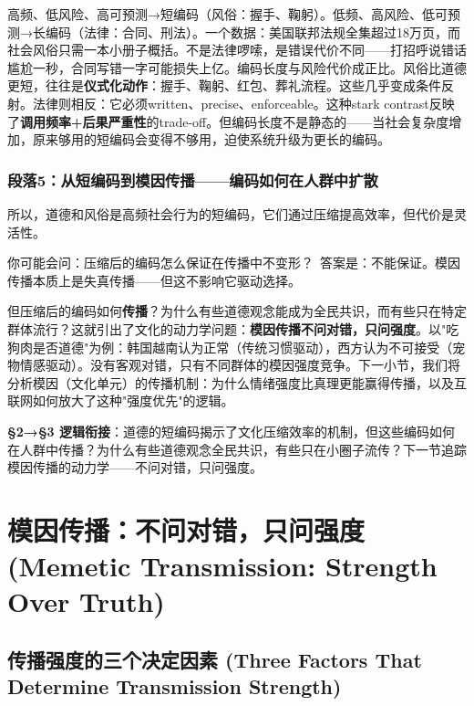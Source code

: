 \documentclass[../main.tex]{subfiles}
\begin{document}
高频、低风险、高可预测→短编码（风俗：握手、鞠躬）。低频、高风险、低可预测→长编码（法律：合同、刑法）。一个数据：美国联邦法规全集超过18万页，而社会风俗只需一本小册子概括。不是法律啰嗦，是错误代价不同——打招呼说错话尴尬一秒，合同写错一字可能损失上亿。编码长度与风险代价成正比。风俗比道德更短，往往是\textbf{仪式化动作}：握手、鞠躬、红包、葬礼流程。这些几乎变成条件反射。法律则相反：它必须written、precise、enforceable。这种stark contrast反映了\textbf{调用频率+后果严重性}的trade-off。但编码长度不是静态的——当社会复杂度增加，原来够用的短编码会变得不够用，迫使系统升级为更长的编码。

	\subsubsection*{段落5：从短编码到模因传播——编码如何在人群中扩散}

	所以，道德和风俗是高频社会行为的短编码，它们通过压缩提高效率，但代价是灵活性。

	\begin{tcolorbox}[colback=yellow!5, title=\textit{读者行为预测}]

		你可能会问：压缩后的编码怎么保证在传播中不变形？\ 答案是：不能保证。模因传播本质上是失真传播——但这不影响它驱动选择。

	\end{tcolorbox}

但压缩后的编码如何\textbf{传播}？为什么有些道德观念能成为全民共识，而有些只在特定群体流行？这就引出了文化的动力学问题：\textbf{模因传播不问对错，只问强度}。以"吃狗肉是否道德"为例：韩国越南认为正常（传统习惯驱动），西方认为不可接受（宠物情感驱动）。没有客观对错，只有不同群体的模因强度竞争。下一小节，我们将分析模因（文化单元）的传播机制：为什么情绪强度比真理更能赢得传播，以及互联网如何放大了这种"强度优先"的逻辑。

	\textbf{§2→§3 逻辑衔接}：道德的短编码揭示了文化压缩效率的机制，但这些编码如何在人群中传播？为什么有些道德观念全民共识，有些只在小圈子流传？下一节追踪模因传播的动力学——不问对错，只问强度。

	\section{模因传播：不问对错，只问强度 (Memetic Transmission: Strength Over Truth)}

	\subsection{传播强度的三个决定因素 (Three Factors That Determine Transmission Strength)}
\end{document}

